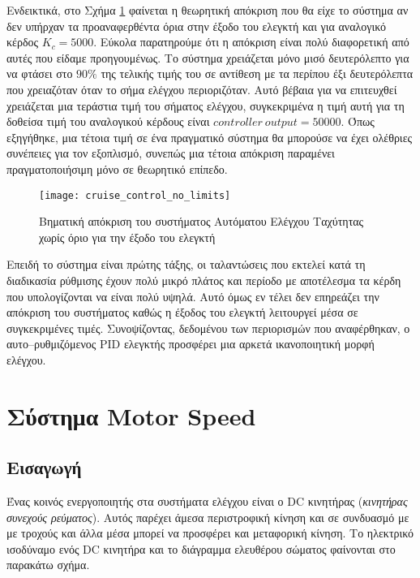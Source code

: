 Ενδεικτικά, στο Σχήμα \ref{fig:cruise_control_no_limits} φαίνεται η θεωρητική απόκριση που θα είχε το σύστημα αν δεν υπήρχαν τα προαναφερθέντα όρια στην έξοδο του ελεγκτή και για αναλογικό κέρδος $K_c = 5000$. Εύκολα παρατηρούμε ότι η απόκριση είναι πολύ διαφορετική από αυτές που είδαμε προηγουμένως. Το σύστημα χρειάζεται μόνο μισό δευτερόλεπτο για να φτάσει στο $90\%$ της τελικής τιμής του σε αντίθεση με τα περίπου έξι δευτερόλεπτα που χρειαζόταν όταν το σήμα ελέγχου περιοριζόταν. Αυτό βέβαια για να επιτευχθεί χρειάζεται μια τεράστια τιμή του σήματος ελέγχου, συγκεκριμένα η τιμή αυτή για τη δοθείσα τιμή του αναλογικού κέρδους είναι $controller\ output = 50000$. Όπως εξηγήθηκε, μια τέτοια τιμή σε ένα πραγματικό σύστημα θα μπορούσε να έχει ολέθριες συνέπειες για τον εξοπλισμό, συνεπώς μια τέτοια απόκριση παραμένει πραγματοποιήσιμη μόνο σε θεωρητικό επίπεδο.

\begin{figure}[h]
  \centering
  \texttt{[image: cruise\_control\_no\_limits]}
  \caption{Βηματική απόκριση του συστήματος Αυτόματου Ελέγχου Ταχύτητας χωρίς όριο για την έξοδο του ελεγκτή}
  \label{fig:cruise_control_no_limits}
\end{figure}

Επειδή το σύστημα είναι πρώτης τάξης, οι ταλαντώσεις που εκτελεί κατά τη διαδικασία ρύθμισης έχουν πολύ μικρό πλάτος και περίοδο με αποτέλεσμα τα κέρδη που υπολογίζονται να είναι πολύ υψηλά. Αυτό όμως εν τέλει δεν επηρεάζει την απόκριση του συστήματος καθώς η έξοδος του ελεγκτή λειτουργεί μέσα σε συγκεκριμένες τιμές. Συνοψίζοντας, δεδομένου των περιορισμών που αναφέρθηκαν, ο αυτο--ρυθμιζόμενος PID ελεγκτής προσφέρει μια αρκετά ικανοποιητική μορφή ελέγχου.

\section{Σύστημα Motor Speed} \label{sec:motor_speed}

\subsection{Εισαγωγή}

Ένας κοινός ενεργοποιητής στα συστήματα ελέγχου είναι ο DC κινητήρας (\emph{κινητήρας συνεχούς ρεύματος}). Αυτός παρέχει άμεσα περιστροφική κίνηση και σε συνδυασμό με με τροχούς και άλλα μέσα μπορεί να προσφέρει και μεταφορική κίνηση. Το ηλεκτρικό ισοδύναμο ενός  DC κινητήρα και το διάγραμμα ελευθέρου σώματος φαίνονται στο παρακάτω σχήμα. 

